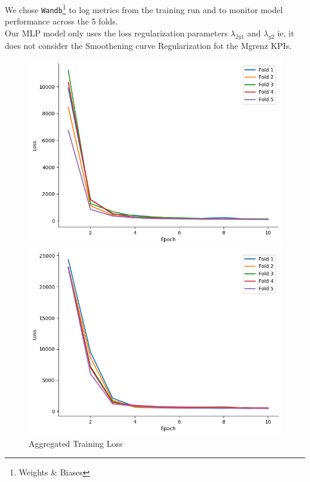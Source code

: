 \documentclass{report} %
\begin{document}
We chose \texttt{Wandb}\footnote{Weights \& Biases} to log metrics from the training run and to monitor model performance across the 5 folds. \\
Our \ac{MLP} model only uses the loss regularization parameters \textit{$\lambda_{2y1}$} and \textit{$\lambda_{y2}$} ie, it does not consider the Smoothening curve Regularization fot the Mgrenz \ac{KPI}s.
\begin{figure}[H]
    \centering
    \begin{minipage}[b]{0.325\textwidth}
        \includegraphics[width=\textwidth]{./ReportImages/train_loss.png}
        \caption{\centering Aggregated Training Loss}
        \label{fig:Aggregated Training Loss}
    \end{minipage}
    \hfill
    \begin{minipage}[b]{0.325\textwidth}
        \includegraphics[width=\textwidth]{./ReportImages/train_loss_y1.png}

\end{minipage}
\end{figure}
\end{document}
